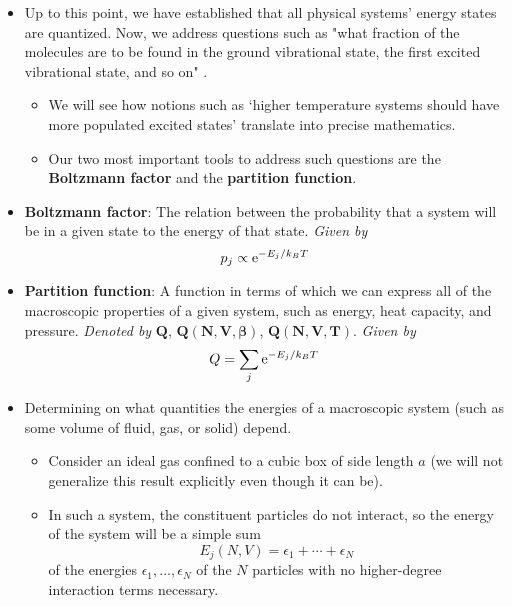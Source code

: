 \documentclass[../notes.tex]{subfiles}
\begin{document}
\begin{itemize}
    \item {}Up to this point, we have established that all physical systems' energy states are quantized. Now, we address questions such as "what fraction of the molecules are to be found in the ground vibrational state, the first excited vibrational state, and so on" \parencite[693]{bib:McQuarrieSimon}.
    \begin{itemize}
        \item We will see how notions such as `higher temperature systems should have more populated excited states' translate into precise mathematics.
        \item Our two most important tools to address such questions are the \textbf{Boltzmann factor} and the \textbf{partition function}.
    \end{itemize}
    \item \textbf{Boltzmann factor}: The relation between the probability that a system will be in a given state to the energy of that state. \emph{Given by}
    \begin{equation*}
        p_j \propto \e[-E_j/k_BT]
    \end{equation*}
    \item \textbf{Partition function}: A function in terms of which we can express all of the macroscopic properties of a given system, such as energy, heat capacity, and pressure. \emph{Denoted by} $\bm{Q}$, $\bm{Q(N,V,\beta)}$, $\bm{Q(N,V,T)}$. \emph{Given by}
    \begin{equation*}
        Q = \sum_j\e[-E_j/k_BT]
    \end{equation*}
    \item Determining on what quantities the energies of a macroscopic system (such as some volume of fluid, gas, or solid) depend.
    \begin{itemize}
        \item Consider an ideal gas confined to a cubic box of side length $a$ (we will not generalize this result explicitly even though it can be).
        \item In such a system, the constituent particles do not interact, so the energy of the system will be a simple sum
        \begin{equation*}
            E_j(N,V) = \epsilon_1+\cdots+\epsilon_N
        \end{equation*}
        of the energies $\epsilon_1,\dots,\epsilon_N$ of the $N$ particles with no higher-degree interaction terms necessary.

\end{itemize}
\end{itemize}
\end{document}
